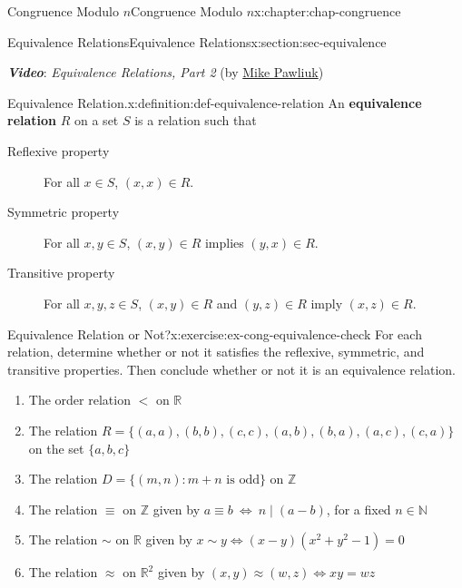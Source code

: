 \documentclass[oneside,10pt,]{book}
\newcommand{\alert}[1]{\textbf{\textit{#1}}}
\newcommand{\terminology}[1]{\textbf{#1}}
\numberwithin{equation}{section}
\newlength{\qrsize}
\newcommand{\lt}{<}
\begin{document}
\begin{chapterptx}{Congruence Modulo \(n\)}{}{Congruence Modulo \(n\)}{}{}{x:chapter:chap-congruence}
\begin{sectionptx}{Equivalence Relations}{}{Equivalence Relations}{}{}{x:section:sec-equivalence}
\begin{sidebyside}{1}{0}{0}{0}
\begin{sbspanel}{1}
\begin{tcbraster}[raster columns=2, raster column skip=1pt, raster halign=center, raster force size=false, raster left skip=0pt, raster right skip=0pt]
\end{tcbraster}%
\end{sbspanel}%
\end{sidebyside}%
\par
\alert{Video}: \emph{Equivalence Relations, Part 2} (by \href{https://www.youtube.com/channel/UCnzqLoGhxAA46i9xcPHZavQ}{Mike Pawliuk})%
\begin{definition}{Equivalence Relation.}{x:definition:def-equivalence-relation}%
An \terminology{equivalence relation} \(R\) on a set \(S\) is a relation such that%
\begin{description}
\item[{Reflexive property}]For all \(x \in S\), \((x,x) \in R\).%
\item[{Symmetric property}]For all \(x, y \in S\), \((x,y) \in R\) implies \((y,x) \in R\).%
\item[{Transitive property}]For all \(x, y, z \in S\), \((x,y) \in R\) and \((y,z) \in R\) imply \((x,z) \in R\).%
\end{description}
%
\end{definition}
\begin{inlineexercise}{Equivalence Relation or Not?}{x:exercise:ex-cong-equivalence-check}%
For each relation, determine whether or not it satisfies the reflexive, symmetric, and transitive properties. Then conclude whether or not it is an equivalence relation.%
\begin{enumerate}[label=(\alph*)]
\item{}The order relation \(\lt\) on \(\mathbb{R}\)%
\item{}The relation \(R = \{(a,a),(b,b),(c,c),(a,b),(b,a),(a,c),(c,a)\}\) on the set \(\{a,b,c\}\)%
\item{}The relation \(D = \{(m,n): m + n \text{ is odd} \}\) on \(\mathbb{Z}\)%
\item{}The relation \(\equiv\) on \(\mathbb{Z}\) given by \(a \equiv b \ \Leftrightarrow \ n \mid (a-b)\), for a fixed \(n \in \mathbb{N}\)%
\item{}The relation \(\sim\) on \(\mathbb{R}\) given by \(x \sim y \Leftrightarrow (x-y)(x^2+y^2-1) = 0\)%
\item{}The relation \(\approx\) on \(\mathbb{R}^2\) given by \((x,y) \approx (w,z) \Leftrightarrow xy = wz\)%
\end{enumerate}
%
\end{inlineexercise}%
\begin{sidebyside}{1}{0}{0}{0}%
\begin{sbspanel}{1}%
\setlength{\qrsize}{9em}

\end{sbspanel}
\end{sidebyside}
\end{sectionptx}
\end{chapterptx}
\end{document}
